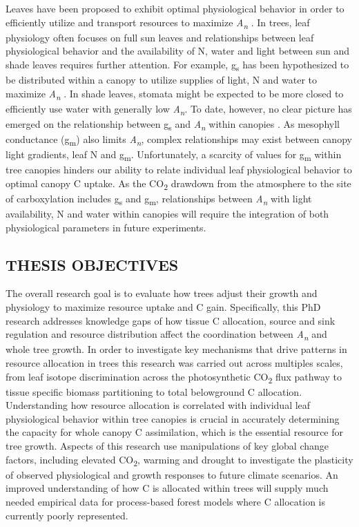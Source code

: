 \documentclass[a4paper]{article}
\begin{document}
Leaves have been proposed to exhibit optimal physiological behavior in order to efficiently utilize and transport resources to maximize \textit{A\textsubscript{n}} \citep{thornley1972model}. In trees, leaf physiology often focuses on full sun leaves and relationships between leaf physiological behavior and the availability of N, water and light between sun and shade leaves requires further attention. For example, g\textsubscript{s} has been hypothesized to be distributed within a canopy to utilize supplies of light, N and water to maximize \textit{A\textsubscript{n}} \citep{peltoniemi2012co}. In shade leaves, stomata might be expected to be more closed to efficiently use water with generally low \textit{A\textsubscript{n}}. To date, however, no clear picture has emerged on the relationship between g\textsubscript{s} and \textit{A\textsubscript{n}} within canopies \citep[see]{jifon2003moderate, tissue2006spatial, sellin2010variation}. As mesophyll conductance (g\textsubscript{m}) also limits \textit{A\textsubscript{n}}, complex relationships may exist between canopy light gradients, leaf N and g\textsubscript{m}. Unfortunately, a scarcity of values for g\textsubscript{m} within tree canopies \citep[see]{lloyd1992low, warren2003transfer, piel2002effect, warren2007internal} hinders our ability to relate individual leaf physiological behavior to optimal canopy C uptake. As the CO\textsubscript{2} drawdown from the atmosphere to the site of carboxylation includes g\textsubscript{s} and g\textsubscript{m}, relationships between \textit{A\textsubscript{n}} with light availability, N and water within canopies will require the integration of both physiological parameters in future experiments.

\subsection*{THESIS OBJECTIVES}
The overall research goal is to evaluate how trees adjust their growth and physiology to maximize resource uptake and C gain. Specifically, this PhD research addresses knowledge gaps of how tissue C allocation, source and sink regulation and resource distribution affect the coordination between \textit{A\textsubscript{n}} and whole tree growth. In order to investigate key mechanisms that drive patterns in resource allocation in trees this research was carried out across multiples scales, from leaf isotope discrimination across the photosynthetic CO\textsubscript{2} flux pathway to tissue specific biomass partitioning to total belowground C allocation. Understanding how resource allocation is correlated with individual leaf physiological behavior within tree canopies is crucial in accurately determining the capacity for whole canopy C assimilation, which is the essential resource for tree growth. Aspects of this research use manipulations of key global change factors, including elevated CO\textsubscript{2}, warming and drought to investigate the plasticity of observed physiological and growth responses to future climate scenarios. An improved understanding of how C is allocated within trees will supply much needed empirical data for process-based forest models where C allocation is currently poorly represented. 
\end{document}
